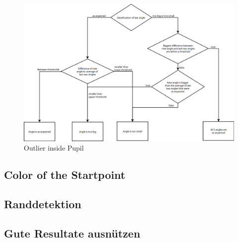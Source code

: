 \begin{figure}{}
	\centering
	\includegraphics[width=1\linewidth]{images/angleclassification.png}
	\caption{Outlier inside Pupil}
	\label{fig:outlierInside}
\end{figure}
\subsection{Color of the Startpoint}
\label{sec:colorStartpoint}

\subsection{Randdetektion}
\label{sec:randdetektion}
\subsection{Gute Resultate ausn\"utzen}
\label{sec:guteResultate}


